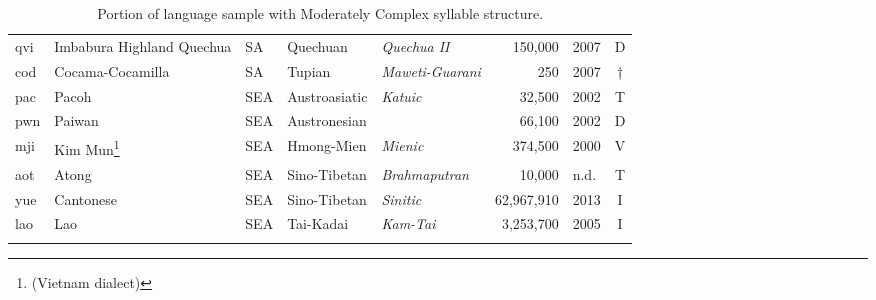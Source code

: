 \begin{table}
\begin{tabularx}{\textwidth}{lQlQQrlc}
 qvi & {{Imbabura Highland Quechua}} &  SA & {Quechuan} & {\textit{Quechua II}} &  150,000 & 2007 & D\\
 cod & {{Cocama-Cocamilla}} &  SA & {Tupian} & {\textit{Maweti-Guarani}} &  250 & 2007 & †\\
 pac & {{Pacoh}} &  SEA  & {Austroasiatic} & {\textit{Katuic}} &  32,500 & 2002 & T\\
 pwn & {{Paiwan}} &  SEA  & {Austronesian} &  &  66,100 & 2002 & D\\
 mji & {{Kim Mun\footnote{(Vietnam dialect)}}} &  SEA  & {Hmong-Mien} & {\textit{Mienic}} &  374,500 & 2000 & V\\
 aot & {{Atong}} &  SEA  & {Sino-Tibetan} & {\textit{Brahmaputran}} &  10,000 & n.d. & T\\
 yue & {{Cantonese}} &  SEA  & {Sino-Tibetan} & {\textit{Sinitic}} &  62,967,910 & 2013 & I\\
 lao & {{Lao}} &  SEA  & {Tai-Kadai} & {\textit{Kam-Tai}} &  3,253,700 & 2005 & I\\
\lspbottomrule
\end{tabularx}
\caption{Portion of language sample with Moderately Complex syllable structure.\label{tab:A.2}}
\end{table}


